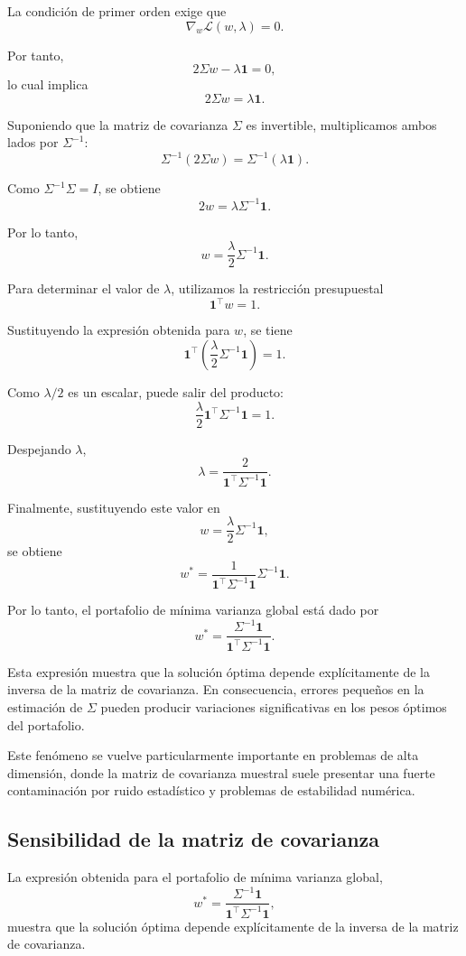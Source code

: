 \documentclass[letterpaper,12pt,oneside]{book}
\begin{document}
La condición de primer orden exige que
\[
\nabla_w \mathcal{L}(w,\lambda)=0.
\]

Por tanto,
\[
2\Sigma w
-
\lambda \mathbf{1}
=
0,
\]
lo cual implica
\[
2\Sigma w
=
\lambda \mathbf{1}.
\]

Suponiendo que la matriz de covarianza \(\Sigma\) es invertible, multiplicamos ambos lados por \(\Sigma^{-1}\):
\[
\Sigma^{-1}(2\Sigma w)
=
\Sigma^{-1}(\lambda \mathbf{1}).
\]

Como \(\Sigma^{-1}\Sigma=I\), se obtiene
\[
2w
=
\lambda \Sigma^{-1}\mathbf{1}.
\]

Por lo tanto,
\[
w
=
\frac{\lambda}{2}
\Sigma^{-1}\mathbf{1}.
\]

Para determinar el valor de \(\lambda\), utilizamos la restricción presupuestal
\[
\mathbf{1}^\top w = 1.
\]

Sustituyendo la expresión obtenida para \(w\), se tiene
\[
\mathbf{1}^\top
\left(
\frac{\lambda}{2}
\Sigma^{-1}\mathbf{1}
\right)
=
1.
\]

Como \(\lambda/2\) es un escalar, puede salir del producto:
\[
\frac{\lambda}{2}
\mathbf{1}^\top
\Sigma^{-1}
\mathbf{1}
=
1.
\]

Despejando \(\lambda\),
\[
\lambda
=
\frac{
2
}{
\mathbf{1}^\top
\Sigma^{-1}
\mathbf{1}
}.
\]

Finalmente, sustituyendo este valor en
\[
w
=
\frac{\lambda}{2}
\Sigma^{-1}\mathbf{1},
\]
se obtiene
\[
w^*
=
\frac{1}{\mathbf{1}^\top\Sigma^{-1}\mathbf{1}}
\Sigma^{-1}\mathbf{1}.
\]

Por lo tanto, el portafolio de mínima varianza global está dado por
\[
w^*
=
\frac{
\Sigma^{-1}\mathbf{1}
}{
\mathbf{1}^\top
\Sigma^{-1}
\mathbf{1}
}.
\]

Esta expresión muestra que la solución óptima depende explícitamente de la inversa de la matriz de covarianza. En consecuencia, errores pequeños en la estimación de \(\Sigma\) pueden producir variaciones significativas en los pesos óptimos del portafolio.

Este fenómeno se vuelve particularmente importante en problemas de alta dimensión, donde la matriz de covarianza muestral suele presentar una fuerte contaminación por ruido estadístico y problemas de estabilidad numérica.

\subsection{Sensibilidad de la matriz de covarianza}

La expresión obtenida para el portafolio de mínima varianza global,
\[
w^*
=
\frac{
\Sigma^{-1}\mathbf{1}
}{
\mathbf{1}^\top
\Sigma^{-1}\mathbf{1}
},
\]
muestra que la solución óptima depende explícitamente de la inversa de la matriz de covarianza.
\end{document}
